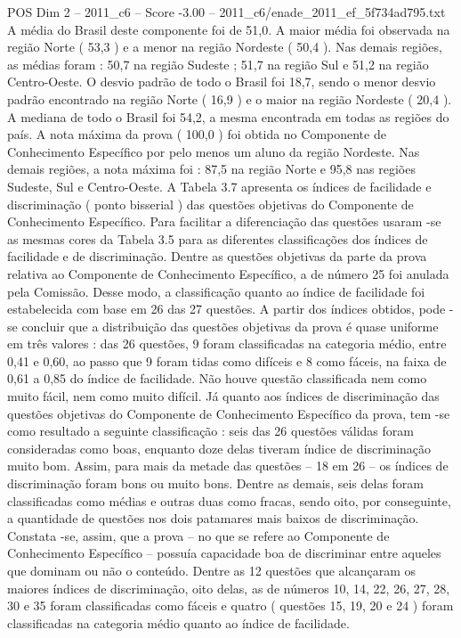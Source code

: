 \begin{textsample}{POS Dim 2 – 2011\_c6 – Score -3.00 – 2011\_c6/enade\_2011\_ef\_5f734ad795.txt}
A média do Brasil deste componente foi de 51,0.
A maior média foi observada na região Norte ( 53,3 ) e a menor na região Nordeste ( 50,4 ).
Nas demais regiões, as médias foram : 50,7 na região Sudeste ; 51,7 na região Sul e 51,2 na região Centro-Oeste.
O desvio padrão de todo o Brasil foi 18,7, sendo o menor desvio padrão encontrado na região Norte ( 16,9 ) e o maior na região Nordeste ( 20,4 ).
A mediana de todo o Brasil foi 54,2, a mesma encontrada em todas as regiões do país.
A nota máxima da prova ( 100,0 ) foi obtida no Componente de Conhecimento Específico por pelo menos um aluno da região Nordeste.
Nas demais regiões, a nota máxima foi : 87,5 na região Norte e 95,8 nas regiões Sudeste, Sul e Centro-Oeste.
A Tabela 3.7 apresenta os índices de facilidade e discriminação ( ponto bisserial ) das questões objetivas do Componente de Conhecimento Específico.
Para facilitar a diferenciação das questões usaram -se as mesmas cores da Tabela 3.5 para as diferentes classificações dos índices de facilidade e de discriminação.
Dentre as questões objetivas da parte da prova relativa ao Componente de Conhecimento Específico, a de número 25 foi anulada pela Comissão.
Desse modo, a classificação quanto ao índice de facilidade foi estabelecida com base em 26 das 27 questões.
A partir dos índices obtidos, pode -se concluir que a distribuição das questões objetivas da prova é quase uniforme em três valores : das 26 questões, 9 foram classificadas na categoria médio, entre 0,41 e 0,60, ao passo que 9 foram tidas como difíceis e 8 como fáceis, na faixa de 0,61 a 0,85 do índice de facilidade.
Não houve questão classificada nem como muito fácil, nem como muito difícil.
Já quanto aos índices de discriminação das questões objetivas do Componente de Conhecimento Específico da prova, tem -se como resultado a seguinte classificação : seis das 26 questões válidas foram consideradas como boas, enquanto doze delas tiveram índice de discriminação muito bom.
Assim, para mais da metade das questões – 18 em 26 – os índices de discriminação foram bons ou muito bons.
Dentre as demais, seis delas foram classificadas como médias e outras duas como fracas, sendo oito, por conseguinte, a quantidade de questões nos dois patamares mais baixos de discriminação.
Constata -se, assim, que a prova – no que se refere ao Componente de Conhecimento Específico – possuía capacidade boa de discriminar entre aqueles que dominam ou não o conteúdo.
Dentre as 12 questões que alcançaram os maiores índices de discriminação, oito delas, as de números 10, 14, 22, 26, 27, 28, 30 e 35 foram classificadas como fáceis e quatro ( questões 15, 19, 20 e 24 ) foram classificadas na categoria médio quanto ao índice de facilidade.

\end{textsample}
